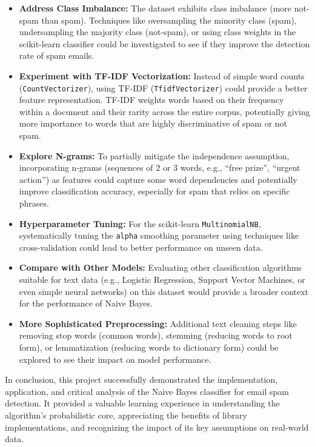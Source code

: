 \documentclass[12pt,letterpaper]{article}
\begin{document}
\begin{itemize}
    \item \textbf{Address Class Imbalance:} The dataset exhibits class imbalance (more not-spam than spam). Techniques like oversampling the minority class (spam), undersampling the majority class (not-spam), or using class weights in the scikit-learn classifier could be investigated to see if they improve the detection rate of spam emails.
    
    \item \textbf{Experiment with TF-IDF Vectorization:} Instead of simple word counts (\texttt{CountVectorizer}), using TF-IDF (\texttt{TfidfVectorizer}) could provide a better feature representation. TF-IDF weights words based on their frequency within a document and their rarity across the entire corpus, potentially giving more importance to words that are highly discriminative of spam or not spam.
    
    \item \textbf{Explore N-grams:} To partially mitigate the independence assumption, incorporating n-grams (sequences of 2 or 3 words, e.g., ``free prize'', ``urgent action'') as features could capture some word dependencies and potentially improve classification accuracy, especially for spam that relies on specific phrases.
    
    \item \textbf{Hyperparameter Tuning:} For the scikit-learn \texttt{MultinomialNB}, systematically tuning the \texttt{alpha} smoothing parameter using techniques like cross-validation could lead to better performance on unseen data.
    
    \item \textbf{Compare with Other Models:} Evaluating other classification algorithms suitable for text data (e.g., Logistic Regression, Support Vector Machines, or even simple neural networks) on this dataset would provide a broader context for the performance of Naive Bayes.
    
    \item \textbf{More Sophisticated Preprocessing:} Additional text cleaning steps like removing stop words (common words), stemming (reducing words to root form), or lemmatization (reducing words to dictionary form) could be explored to see their impact on model performance.
\end{itemize}

In conclusion, this project successfully demonstrated the implementation, application, and critical analysis of the Naive Bayes classifier for email spam detection. It provided a valuable learning experience in understanding the algorithm's probabilistic core, appreciating the benefits of library implementations, and recognizing the impact of its key assumptions on real-world data.
\end{document}
